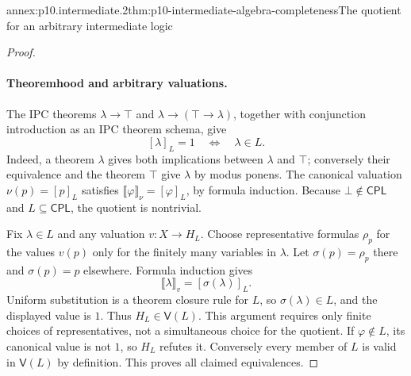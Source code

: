 \begin{annexitem}{annex:p10.intermediate.2}{thm:p10-intermediate-algebra-completeness}{The quotient for an arbitrary intermediate logic}
\begin{proof}
\paragraph{Theoremhood and arbitrary valuations.}
The IPC theorems \(\lambda\to\top\) and
\(\lambda\to(\top\to\lambda)\), together with conjunction
introduction as an IPC theorem schema, give
\[
 [\lambda]_L=1\quad\Longleftrightarrow\quad\lambda\in L.
\]
Indeed, a theorem \(\lambda\) gives both implications between
\(\lambda\) and \(\top\); conversely their equivalence and the
theorem \(\top\) give \(\lambda\) by modus ponens.
The canonical valuation \(\nu(p)=[p]_L\) satisfies
\(\llbracket\varphi\rrbracket_\nu=[\varphi]_L\), by formula induction.
Because \(\bot\notin\mathsf{CPL}\) and \(L\subseteq\mathsf{CPL}\),
the quotient is nontrivial.

Fix \(\lambda\in L\) and any valuation \(v:X\to H_L\).
Choose representative formulas \(\rho_p\) for the values \(v(p)\)
only for the finitely many variables in \(\lambda\).
Let \(\sigma(p)=\rho_p\) there and \(\sigma(p)=p\) elsewhere.
Formula induction gives
\[
 \llbracket\lambda\rrbracket_v=[\sigma(\lambda)]_L.
\]
Uniform substitution is a theorem closure rule for \(L\), so
\(\sigma(\lambda)\in L\), and the displayed value is \(1\).
Thus \(H_L\in\mathsf V(L)\).  This argument requires only finite
choices of representatives, not a simultaneous choice for the quotient.
If \(\varphi\notin L\), its canonical value is not \(1\), so
\(H_L\) refutes it.  Conversely every member of \(L\) is valid in
\(\mathsf V(L)\) by definition.  This proves all claimed equivalences.
\end{proof}
\end{annexitem}

